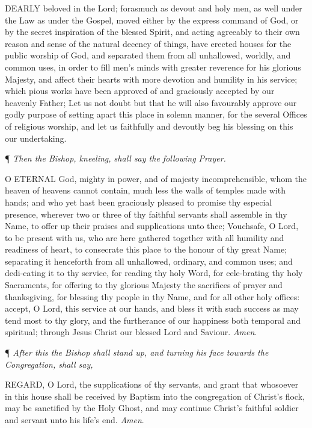 DEARLY
beloved in the Lord; forasmuch as devout and holy men, as well under the
Law as under the Gospel, moved either by the express command of God, or
by the secret inspiration of the blessed Spirit, and acting agreeably
to their own reason and sense of the natural decency of things, have erected
houses for the public worship of God, and separated them from all unhallowed,
worldly, and common uses, in order to fill men's minds with greater reverence
for his glorious Majesty, and affect their hearts with more devotion and
humility in his service; which pious works have been approved of and graciously
accepted by our heavenly Father; Let us not doubt but that he will also
favourably approve our godly purpose of setting apart this place in solemn
manner, for the several Offices of religious worship, and let us faithfully
and devoutly beg his blessing on this our undertaking. 

¶
\emph{Then the Bishop, kneeling, shall say the following Prayer.}

O
ETERNAL God, mighty in power, and of majesty incomprehensible, whom
the heaven of heavens cannot contain, much less the walls of temples
made with hands; and who yet hast been graciously pleased to promise
thy especial presence, wherever two or three of thy faithful servants
shall assemble in thy Name, to offer up their praises and supplications
unto thee; Vouchsafe, O Lord, to be present with us, who are here gathered
together with all humility and readiness of heart, to consecrate this
place to the honour of thy great Name; separating it henceforth from
all unhallowed, ordinary, and common uses; and dedi-cating it to thy
service, for reading thy holy Word, for cele-brating thy holy Sacraments,
for offering to thy glorious Majesty the sacrifices of prayer and thanksgiving,
for blessing thy people in thy Name, and for all other holy offices:
accept, O Lord, this service at our hands, and bless it with such success
as may tend most to thy glory, and the furtherance of our happiness
both temporal and spiritual; through Jesus Christ our blessed Lord and
Saviour. \emph{Amen}.

¶
\emph{After this the Bishop shall stand up, and turning his face towards
the Congregation, shall say,}

REGARD,
O Lord, the supplications of thy servants, and grant that whosoever
in this house shall be received by Baptism into the congregation of
Christ's flock, may be sanctified by the Holy Ghost, and may continue
Christ's faithful soldier and servant unto his life's end. \emph{Amen}.

